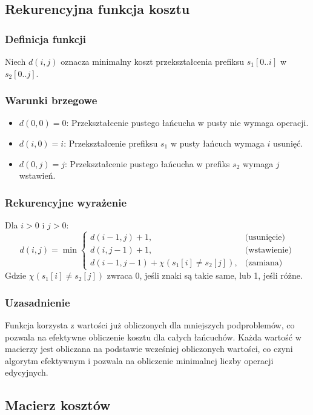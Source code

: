 \subsection{Rekurencyjna funkcja kosztu}
\subsubsection{Definicja funkcji}
Niech \(d(i, j)\) oznacza minimalny koszt przekształcenia prefiksu \(s_1[0..i]\) w \(s_2[0..j]\).

\subsubsection{Warunki brzegowe}
\begin{itemize}
    \item \(d(0, 0) = 0\): Przekształcenie pustego łańcucha w pusty nie wymaga operacji.
    \item \(d(i, 0) = i\): Przekształcenie prefiksu \(s_1\) w pusty łańcuch wymaga \(i\) usunięć.
    \item \(d(0, j) = j\): Przekształcenie pustego łańcucha w prefiks \(s_2\) wymaga \(j\) wstawień.
\end{itemize}

\subsubsection{Rekurencyjne wyrażenie}
Dla \(i > 0\) i \(j > 0\):
\[
d(i, j) = \min \begin{cases} 
d(i-1, j) + 1, & \text{(usunięcie)} \\
d(i, j-1) + 1, & \text{(wstawienie)} \\
d(i-1, j-1) + \chi(s_1[i] \neq s_2[j]), & \text{(zamiana)}
\end{cases}
\] 
\label{eq:rekurencyjne-wyrazenie}
Gdzie \(\chi(s_1[i] \neq s_2[j])\) zwraca 0, jeśli znaki są takie same, lub 1, jeśli różne.

\subsubsection{Uzasadnienie}
Funkcja korzysta z wartości już obliczonych dla mniejszych podproblemów, co pozwala na efektywne obliczenie kosztu dla całych łańcuchów. Każda wartość w macierzy jest obliczana na podstawie wcześniej obliczonych wartości, co czyni algorytm efektywnym i pozwala na obliczenie minimalnej liczby operacji edycyjnych.

\subsection{Macierz kosztów}
